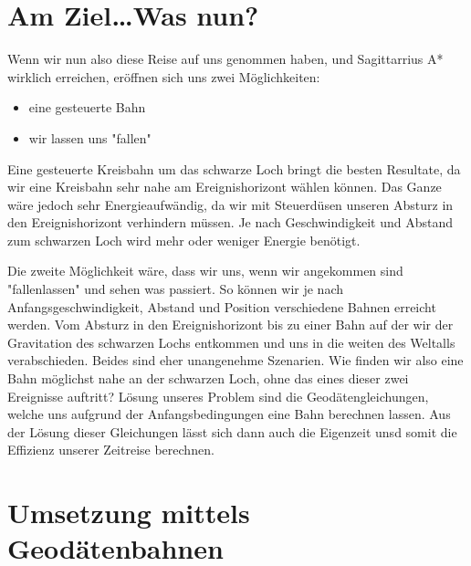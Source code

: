 \begin{refsection}
	\section{Am Ziel\dots Was nun?}
	
	Wenn wir nun also diese Reise auf uns genommen haben, und Sagittarrius A* wirklich erreichen, eröffnen sich uns zwei Möglichkeiten:
	\begin{itemize}
		\item eine gesteuerte Bahn
		\item wir lassen uns "fallen"
	\end{itemize}
	Eine gesteuerte Kreisbahn um das schwarze Loch bringt die besten Resultate, da wir eine Kreisbahn sehr nahe am Ereignishorizont wählen können. Das Ganze wäre jedoch sehr Energieaufwändig, da wir mit Steuerdüsen unseren Absturz in den Ereignishorizont verhindern müssen. Je nach Geschwindigkeit und Abstand zum schwarzen Loch wird mehr oder weniger Energie benötigt.
	
	Die zweite Möglichkeit wäre, dass wir uns, wenn wir angekommen sind "fallenlassen" und sehen was passiert. So können wir je nach Anfangsgeschwindigkeit, Abstand und Position verschiedene Bahnen erreicht werden. Vom Absturz in den Ereignishorizont bis zu einer Bahn auf der wir der Gravitation des schwarzen Lochs entkommen und uns in die weiten des Weltalls verabschieden. Beides sind eher unangenehme Szenarien. 
	Wie finden wir also eine Bahn möglichst nahe an der schwarzen Loch, ohne das eines dieser zwei Ereignisse auftritt?
	Lösung unseres Problem sind die Geodätengleichungen, welche uns aufgrund der Anfangsbedingungen eine Bahn berechnen lassen. Aus der Lösung dieser Gleichungen lässt sich dann auch die Eigenzeit unsd somit die Effizienz unserer Zeitreise berechnen.
	
	\section{Umsetzung mittels Geodätenbahnen}
	

\end{refsection}
